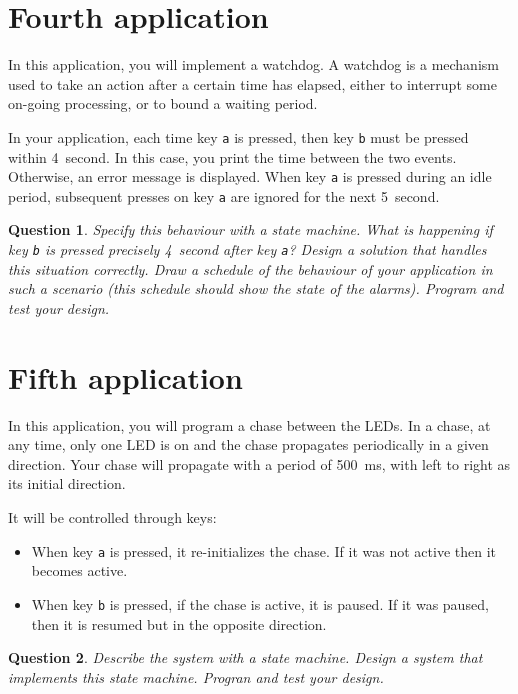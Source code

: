 \documentclass[11pt]{report}
\newtheorem{ex}{Question}
\begin{document}
\section{Fourth application}

In this application, you will implement a watchdog.
A watchdog is a mechanism used to take an action after a certain time has elapsed, either to interrupt some on-going processing, or to bound a waiting period.

In your application, each time key \verb-a- is pressed, then key \verb-b- must be pressed within \SI{4}{second}.
In this case, you print the time between the two events.
Otherwise, an error message is displayed.
When key \verb-a- is pressed during an idle period, subsequent presses on key \verb-a- are ignored for the next \SI{5}{second}.

\begin{ex}
  Specify this behaviour with a state machine.
  What is happening if key \verb-b- is pressed precisely \SI{4}{second} after key \verb-a-?
  Design a solution that handles this situation correctly.
  Draw a schedule of the behaviour of your application in such a scenario (this schedule should show the state of the alarms).
  Program and test your design.
\end{ex}

\section{Fifth application}

In this application, you will program a chase between the LEDs.
In a chase, at any time, only one LED is on and the chase propagates periodically in a given direction.
Your chase will propagate with a period of \SI{500}{\milli\second}, with left to right as its initial direction.

It will be controlled through keys:
\begin{itemize}
  \item
    When key \verb-a- is pressed, it re-initializes the chase.
    If it was not active then it becomes active.
  \item
    When key \verb-b- is pressed, if the chase is active, it is paused.
    If it was paused, then it is resumed but in the opposite direction.
\end{itemize}

\begin{ex}
  Describe the system with a state machine.
  Design a system that implements this state machine.
  Progran and test your design.
\end{ex}
\end{document}

